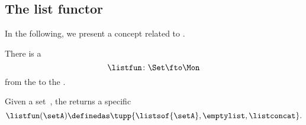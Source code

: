 \subsection{The list functor}
In the following, we present a concept related to .

There is a 
\begin{equation}\label{eq:list-functor-intro}
    \listfun\colon \Set \fto \Mon
\end{equation}
from the  to the .

Given a set~\setA, the  returns a specific 
\begin{equation}\label{eq:list-functor-on-objects}
    \listfun(\setA)\definedas\tupp{\listsof{\setA},\emptylist, \listconcat}.
\end{equation}

